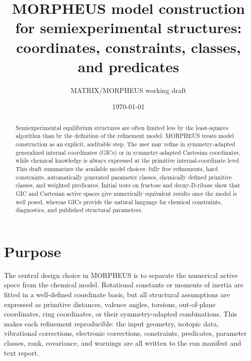 \documentclass[11pt]{article}
\title{MORPHEUS model construction for semiexperimental structures: coordinates, constraints, classes, and predicates}
\author{MATRIX/MORPHEUS working draft}
\date{\today}
\begin{document}
\maketitle

\begin{abstract}
Semiexperimental equilibrium structures are often limited less by the least-squares
algorithm than by the definition of the refinement model.  MORPHEUS treats model
construction as an explicit, auditable step.  The user may refine in symmetry-adapted
generalized internal coordinates (GICs) or in symmetry-adapted Cartesian coordinates,
while chemical knowledge is always expressed at the primitive internal-coordinate
level.  This draft summarizes the available model choices: fully free refinements,
hard constraints, automatically generated parameter classes, chemically defined
primitive classes, and weighted predicates.  Initial tests on fructose and deoxy-D-ribose
show that GIC and Cartesian active spaces give numerically equivalent results once the
model is well posed, whereas GICs provide the natural language for chemical constraints,
diagnostics, and published structural parameters.
\end{abstract}

\section{Purpose}
The central design choice in MORPHEUS is to separate the numerical active space from
the chemical model.  Rotational constants or moments of inertia are fitted in a
well-defined coordinate basis, but all structural assumptions are expressed as primitive
distances, valence angles, torsions, out-of-plane coordinates, ring coordinates, or
their symmetry-adapted combinations.  This makes each refinement reproducible: the
input geometry, isotopic data, vibrational corrections, electronic corrections,
constraints, predicates, parameter classes, rank, covariance, and warnings are all
written to the run manifest and text report.
\end{document}
